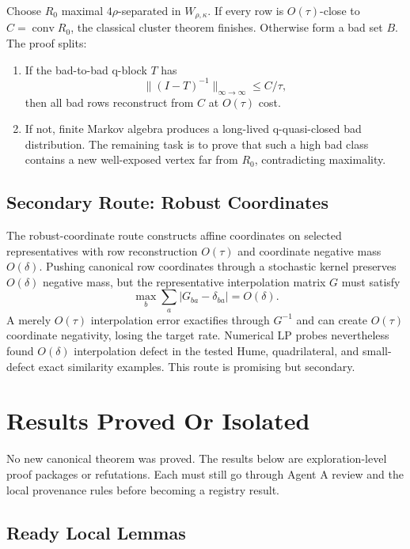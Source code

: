 \documentclass[11pt]{article}
\newcommand{\conv}{\operatorname{conv}}
\theoremstyle{definition}
\begin{document}
Choose \(R_0\) maximal \(4\rho\)-separated in \(W_{\rho,\kappa}\).  If every
row is \(O(\tau)\)-close to \(C=\conv R_0\), the classical cluster theorem
finishes.  Otherwise form a bad set \(B\).  The proof splits:
\begin{enumerate}[label=\arabic*.]
\item If the bad-to-bad q-block \(T\) has
\[
  \|(I-T)^{-1}\|_{\infty\to\infty}\leq C/\tau,
\]
then all bad rows reconstruct from \(C\) at \(O(\tau)\) cost.
\item If not, finite Markov algebra produces a long-lived q-quasi-closed bad
distribution.  The remaining task is to prove that such a high bad class
contains a new well-exposed vertex far from \(R_0\), contradicting maximality.
\end{enumerate}

\subsection{Secondary Route: Robust Coordinates}

The robust-coordinate route constructs affine coordinates on selected
representatives with row reconstruction \(O(\tau)\) and coordinate negative
mass \(O(\delta)\).  Pushing canonical row coordinates through a stochastic
kernel preserves \(O(\delta)\) negative mass, but the representative
interpolation matrix \(G\) must satisfy
\[
  \max_b\sum_a|G_{ba}-\delta_{ba}|=O(\delta).
\]
A merely \(O(\tau)\) interpolation error exactifies through \(G^{-1}\) and can
create \(O(\tau)\) coordinate negativity, losing the target rate.  Numerical
LP probes nevertheless found \(O(\delta)\) interpolation defect in the tested
Hume, quadrilateral, and small-defect exact similarity examples.  This route
is promising but secondary.

\section{Results Proved Or Isolated}

No new canonical theorem was proved.  The results below are exploration-level
proof packages or refutations.  Each must still go through Agent A review and
the local provenance rules before becoming a registry result.

\subsection{Ready Local Lemmas}
\end{document}
